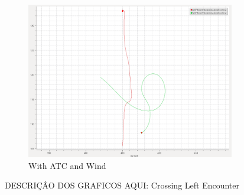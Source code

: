\begin{figure}[H]
            \begin{subfigure}[b]{0.45\textwidth}
                \centering
                \includegraphics[width=\textwidth]{figs/plot_crossingLeft_Wind_E.png}
                \caption{With \ac{ATC} and Wind}
                \label{fig:plot_crossingLeft_Wind_E}
            \end{subfigure}
        
        \caption{DESCRIÇÂO DOS GRAFICOS AQUI: Crossing Left Encounter}
        \label{fig:crossingLeft_E}
        \end{figure}
        
